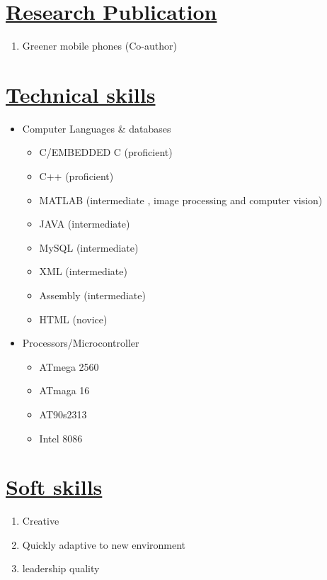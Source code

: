 \documentclass[14pt,a4paper,twoside]{article}
\begin{document}
		
	\section*{\underline{\textbf{Research Publication}}}
		\begin{enumerate}
			\item Greener mobile phones (Co-author)
		\end{enumerate}
	
	\section*{\underline{\textbf{Technical skills}}}
		\begin{itemize}
			\item Computer Languages \& databases
			\begin{itemize}
				\item C/EMBEDDED C		(proficient)
				\item C++				(proficient)
				\item MATLAB			(intermediate , image processing and computer vision)
				\item JAVA				(intermediate)
				\item MySQL				(intermediate)
				\item XML				(intermediate)
				\item Assembly 			(intermediate)
				\item HTML				(novice)	
			\end{itemize}
		\item Processors/Microcontroller
		\begin{itemize}
			\item ATmega 2560		
			\item ATmaga 16
			\item AT90s2313
			\item Intel 8086					
		\end{itemize}
		
		\end{itemize}
		
	\section*{\underline{\textbf{Soft skills}}}
		\begin{enumerate}
			\item Creative
			\item Quickly adaptive to new environment
			\item leadership quality
			
		\end{enumerate}
		
\end{document}
